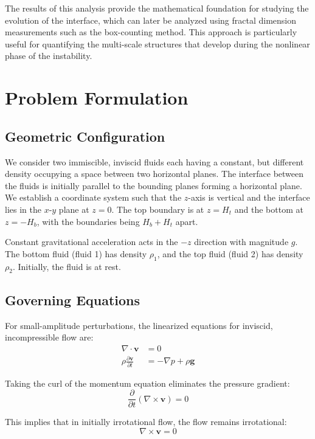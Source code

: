 \documentclass[12pt,a4paper]{article}
\begin{document}
The results of this analysis provide the mathematical foundation for studying the evolution of the interface, which can later be analyzed using fractal dimension measurements such as the box-counting method. This approach is particularly useful for quantifying the multi-scale structures that develop during the nonlinear phase of the instability.

\section{Problem Formulation}
\subsection{Geometric Configuration}
We consider two immiscible, inviscid fluids each having a constant, but different density occupying a space between two horizontal planes. The interface between the fluids is initially parallel to the bounding planes forming a horizontal plane. We establish a coordinate system such that the $z$-axis is vertical and the interface lies in the $x$-$y$ plane at $z = 0$. The top boundary is at $z = H_t$ and the bottom at $z = -H_b$, with the boundaries being $H_b + H_t$ apart.

Constant gravitational acceleration acts in the $-z$ direction with magnitude $g$. The bottom fluid (fluid 1) has density $\rho_1$, and the top fluid (fluid 2) has density $\rho_2$. Initially, the fluid is at rest.

\subsection{Governing Equations}
For small-amplitude perturbations, the linearized equations for inviscid, incompressible flow are:
\begin{align}
\nabla \cdot \mathbf{v} &= 0 \\
\rho \frac{\partial \mathbf{v}}{\partial t} &= -\nabla p + \rho \mathbf{g}
\end{align}

Taking the curl of the momentum equation eliminates the pressure gradient:
\begin{equation}
\frac{\partial}{\partial t}(\nabla \times \mathbf{v}) = 0
\end{equation}

This implies that in initially irrotational flow, the flow remains irrotational:
\begin{equation}
\nabla \times \mathbf{v} = 0
\end{equation}
\end{document}

